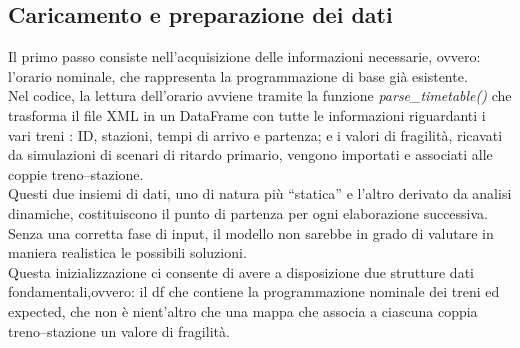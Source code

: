 \documentclass{report}
\begin{document}
\subsection{Caricamento e preparazione dei dati}

Il primo passo consiste nell’acquisizione delle informazioni necessarie, ovvero: l’orario nominale, che rappresenta la programmazione di base già esistente. \\ Nel codice, la lettura dell’orario avviene tramite la funzione \textit{parse\_timetable()} che trasforma il file XML in un DataFrame con tutte le informazioni riguardanti i vari treni : ID, stazioni, tempi di arrivo e partenza; e i valori di fragilità, ricavati da simulazioni di scenari di ritardo primario, vengono importati e associati alle coppie treno–stazione.\\ Questi due insiemi di dati, uno di natura più “statica” e l’altro derivato da analisi dinamiche, costituiscono il punto di partenza per ogni elaborazione successiva. Senza una corretta fase di input, il modello non sarebbe in grado di valutare in maniera realistica le possibili soluzioni. \\ Questa inizializzazione ci consente di avere a disposizione due strutture dati fondamentali,ovvero: il df che contiene la programmazione nominale dei treni ed expected, che non è nient'altro che una mappa che associa a ciascuna coppia treno–stazione un valore di fragilità.
    
\end{document}
